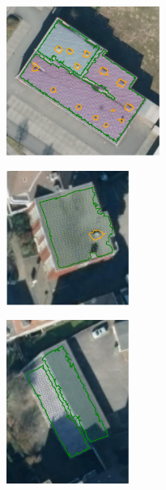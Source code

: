 \begin{figure}[H]
  \begin{subfigure}[t]{.33\linewidth}
    \centering\includegraphics[trim=5mm 5mm 5mm 5mm, clip, width=5cm]{chapter_3_polylidar3d/imgs/rooftop/74359194_satellite.pdf}
    \caption{\label{fig:ch3_rooftop_a}}
  \end{subfigure}
  \hfill
  \begin{subfigure}[t]{.30\linewidth}
    \centering\includegraphics[trim=15mm 8mm 5mm 5mm, clip, width=4cm]{chapter_3_polylidar3d/imgs/rooftop/74200193_satellite.pdf}
    \caption{\label{fig:ch3_rooftop_b}}
  \end{subfigure}
  \hfill
  \begin{subfigure}[t]{.30\linewidth}
    \centering\includegraphics[trim=5mm 7mm 0mm 7mm, clip, width=4cm]{chapter_3_polylidar3d/imgs/rooftop/74272674_satellite.pdf}
    \caption{\label{fig:ch3_rooftop_c}}
  \end{subfigure}
    \par\bigskip
    \centering
  \begin{subfigure}[t]{.55\linewidth}

\end{subfigure}
\end{figure}
